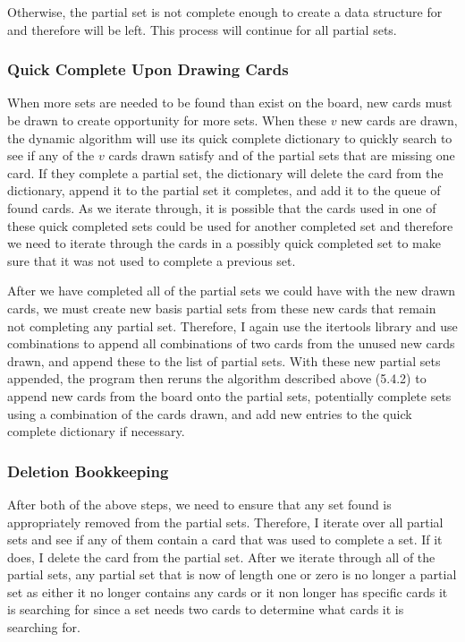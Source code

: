 \documentclass[pageno]{jpaper}
\begin{document}
Otherwise, the partial set is not complete enough to create a data structure for and therefore will be left. This process will continue for all partial sets. 


\subsubsection{Quick Complete Upon Drawing Cards}

When more sets are needed to be found than exist on the board, new cards must be drawn to create opportunity for more sets. When these $v$ new cards are drawn, the dynamic algorithm will use its quick complete dictionary to quickly search to see if any of the $v$ cards drawn satisfy and of the partial sets that are missing one card. If they complete a partial set, the dictionary will delete the card from the dictionary, append it to the partial set it completes, and add it to the queue of found cards. As we iterate through, it is possible that the cards used in one of these quick completed sets could be used for another completed set and therefore we need to iterate through the cards in a possibly quick completed set to make sure that it was not used to complete a previous set. 

After we have completed all of the partial sets we could have with the new drawn cards, we must create new basis partial sets from these new cards that remain not completing any partial set. Therefore, I again use the itertools library and use combinations to append all combinations of two cards from the unused new cards drawn, and append these to the list of partial sets. With these new partial sets appended, the program then reruns the algorithm described above (5.4.2) to append new cards from the board onto the partial sets, potentially complete sets using a combination of the cards drawn, and add new entries to the quick complete dictionary if necessary. 

\subsubsection{Deletion Bookkeeping}

After both of the above steps, we need to ensure that any set found is appropriately removed from the partial sets. Therefore, I iterate over all partial sets and see if any of them contain a card that was used to complete a set. If it does, I delete the card from the partial set. After we iterate through all of the partial sets, any partial set that is now of length one or zero is no longer a partial set as either it no longer contains any cards or it non longer has specific cards it is searching for since a set needs two cards to determine what cards it is searching for.
\end{document}
